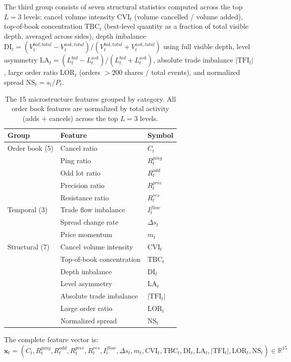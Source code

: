 \documentclass[11pt]{article}
\theoremstyle{definition}
\begin{document}
The third group consists of seven structural statistics computed across the top $L = 3$ levels: cancel volume intensity $\text{CVI}_t$ (volume cancelled / volume added), top-of-book concentration $\text{TBC}_t$ (best-level quantity as a fraction of total visible depth, averaged across sides), depth imbalance $\text{DI}_t = (V_t^{bid,total} - V_t^{ask,total}) / (V_t^{bid,total} + V_t^{ask,total})$ using full visible depth, level asymmetry $\text{LA}_t = (L_t^{bid} - L_t^{ask}) / (L_t^{bid} + L_t^{ask})$, absolute trade imbalance $|\text{TFI}_t|$, large order ratio $\text{LOR}_t$ (orders $> 200$ shares / total events), and normalized spread $\text{NS}_t = s_t / P_t$.

\begin{table}[H]
\centering
\small
\begin{tabular}{lll}
\toprule
\textbf{Group} & \textbf{Feature} & \textbf{Symbol} \\
\midrule
Order book (5) & Cancel ratio & $C_t$ \\
 & Ping ratio & $R_t^{ping}$ \\
 & Odd lot ratio & $R_t^{odd}$ \\
 & Precision ratio & $R_t^{prec}$ \\
 & Resistance ratio & $R_t^{res}$ \\
\midrule
Temporal (3) & Trade flow imbalance & $I_t^{flow}$ \\
 & Spread change rate & $\Delta s_t$ \\
 & Price momentum & $m_t$ \\
\midrule
Structural (7) & Cancel volume intensity & $\text{CVI}_t$ \\
 & Top-of-book concentration & $\text{TBC}_t$ \\
 & Depth imbalance & $\text{DI}_t$ \\
 & Level asymmetry & $\text{LA}_t$ \\
 & Absolute trade imbalance & $|\text{TFI}_t|$ \\
 & Large order ratio & $\text{LOR}_t$ \\
 & Normalized spread & $\text{NS}_t$ \\
\bottomrule
\end{tabular}
\caption{The 15 microstructure features grouped by category. All order book features are normalized by total activity (adds $+$ cancels) across the top $L = 3$ levels.}
\label{tab:features}
\end{table}

The complete feature vector is:
\begin{equation}
\mathbf{x}_t = (C_t, R_t^{ping}, R_t^{odd}, R_t^{prec}, R_t^{res}, I_t^{flow}, \Delta s_t, m_t, \text{CVI}_t, \text{TBC}_t, \text{DI}_t, \text{LA}_t, |\text{TFI}_t|, \text{LOR}_t, \text{NS}_t) \in \mathbb{R}^{15}
\end{equation}
\end{document}
